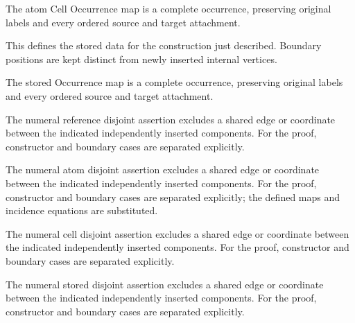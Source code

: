 The atom Cell Occurrence map is a complete occurrence, preserving original labels and every ordered source and target attachment.
\par{}

This defines the stored data for the construction just described. Boundary positions are kept distinct from newly inserted internal vertices.
\par{}

The stored Occurrence map is a complete occurrence, preserving original labels and every ordered source and target attachment.
\par{}

The numeral reference disjoint assertion excludes a shared edge or coordinate between the indicated independently inserted components.
For the proof, constructor and boundary cases are separated explicitly.
\par{}

The numeral atom disjoint assertion excludes a shared edge or coordinate between the indicated independently inserted components.
For the proof, constructor and boundary cases are separated explicitly; the defined maps and incidence equations are substituted.
\par{}

The numeral cell disjoint assertion excludes a shared edge or coordinate between the indicated independently inserted components.
For the proof, constructor and boundary cases are separated explicitly.
\par{}

The numeral stored disjoint assertion excludes a shared edge or coordinate between the indicated independently inserted components.
For the proof, constructor and boundary cases are separated explicitly.
\par{}

